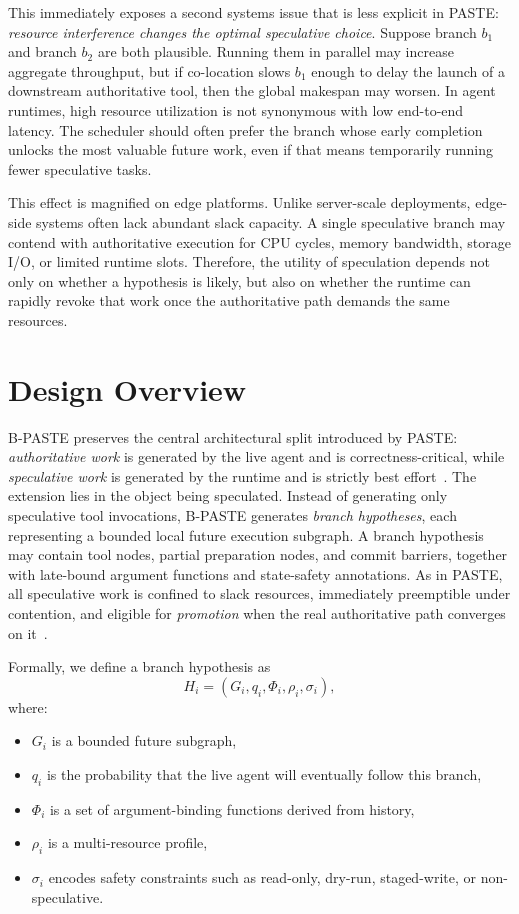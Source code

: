 \documentclass[10pt,twocolumn]{article}
\begin{document}
This immediately exposes a second systems issue that is less explicit in PASTE: \emph{resource interference changes the optimal speculative choice}. Suppose branch $b_1$ and branch $b_2$ are both plausible. Running them in parallel may increase aggregate throughput, but if co-location slows $b_1$ enough to delay the launch of a downstream authoritative tool, then the global makespan may worsen. In agent runtimes, high resource utilization is not synonymous with low end-to-end latency. The scheduler should often prefer the branch whose early completion unlocks the most valuable future work, even if that means temporarily running fewer speculative tasks.

This effect is magnified on edge platforms. Unlike server-scale deployments, edge-side systems often lack abundant slack capacity. A single speculative branch may contend with authoritative execution for CPU cycles, memory bandwidth, storage I/O, or limited runtime slots. Therefore, the utility of speculation depends not only on whether a hypothesis is likely, but also on whether the runtime can rapidly revoke that work once the authoritative path demands the same resources.

\section{Design Overview}

B-PASTE preserves the central architectural split introduced by PASTE: \emph{authoritative work} is generated by the live agent and is correctness-critical, while \emph{speculative work} is generated by the runtime and is strictly best effort~\cite{paste}. The extension lies in the object being speculated. Instead of generating only speculative tool invocations, B-PASTE generates \emph{branch hypotheses}, each representing a bounded local future execution subgraph. A branch hypothesis may contain tool nodes, partial preparation nodes, and commit barriers, together with late-bound argument functions and state-safety annotations. As in PASTE, all speculative work is confined to slack resources, immediately preemptible under contention, and eligible for \emph{promotion} when the real authoritative path converges on it~\cite{paste}.

Formally, we define a branch hypothesis as
\begin{equation}
H_i = (G_i, q_i, \Phi_i, \rho_i, \sigma_i),
\end{equation}
where:
\begin{itemize}[leftmargin=1.5em]
    \item $G_i$ is a bounded future subgraph,
    \item $q_i$ is the probability that the live agent will eventually follow this branch,
    \item $\Phi_i$ is a set of argument-binding functions derived from history,
    \item $\rho_i$ is a multi-resource profile,
    \item $\sigma_i$ encodes safety constraints such as read-only, dry-run, staged-write, or non-speculative.
\end{itemize}
\end{document}
